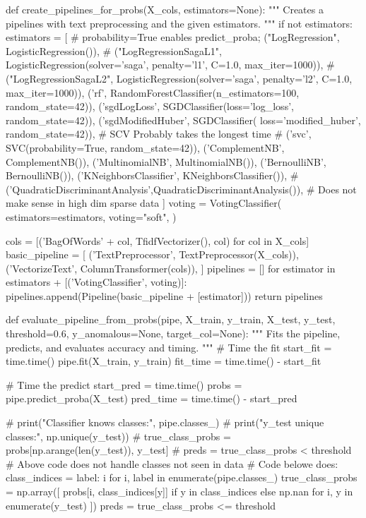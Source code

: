 {{def create_pipelines_for_probs(X_cols, estimators=None):
    """
    Creates a pipelines with text preprocessing and the given estimators.
    """
    if not estimators:
        estimators = [
            # probability=True enables predict_proba;
            ("LogRegression", LogisticRegression()),
            # ("LogRegressionSagaL1", LogisticRegression(solver='saga', penalty='l1', C=1.0, max_iter=1000)),
            # ("LogRegressionSagaL2", LogisticRegression(solver='saga', penalty='l2', C=1.0, max_iter=1000)),
            ('rf', RandomForestClassifier(n_estimators=100, random_state=42)),
            ('sgdLogLoss', SGDClassifier(loss='log_loss', random_state=42)),
            ('sgdModifiedHuber', SGDClassifier(
                loss='modified_huber', random_state=42)),
            # SCV Probably takes the longest time
            # ('svc', SVC(probability=True, random_state=42)),
            ('ComplementNB', ComplementNB()),
            ('MultinomialNB', MultinomialNB()),
            ('BernoulliNB', BernoulliNB()),
            ('KNeighborsClassifier', KNeighborsClassifier()),
            # ('QuadraticDiscriminantAnalysis',QuadraticDiscriminantAnalysis()), # Does not make sense in high dim sparse data
        ]
    voting = VotingClassifier(
        estimators=estimators,
        voting="soft",
    )

    cols = [('BagOfWords' + col, TfidfVectorizer(), col) for col in X_cols]
    basic_pipeline = [
        ('TextPreprocessor', TextPreprocessor(X_cols)),
        ('VectorizeText', ColumnTransformer(cols)),
    ]
    pipelines = []
    for estimator in estimators + [('VotingClassifier', voting)]:
        pipelines.append(Pipeline(basic_pipeline + [estimator]))
    return pipelines


def evaluate_pipeline_from_probs(pipe, X_train, y_train, X_test, y_test, threshold=0.6, y_anomalous=None, target_col=None):
    """
    Fits the pipeline, predicts, and evaluates accuracy and timing.
    """
    # Time the fit
    start_fit = time.time()
    pipe.fit(X_train, y_train)
    fit_time = time.time() - start_fit

    # Time the predict
    start_pred = time.time()
    probs = pipe.predict_proba(X_test)
    pred_time = time.time() - start_pred

    # print("Classifier knows classes:", pipe.classes_)
    # print("y_test unique classes:", np.unique(y_test))
    # true_class_probs = probs[np.arange(len(y_test)), y_test]
    # preds = true_class_probs < threshold
    # Above code does not handle classes not seen in data
    # Code belowe does:
    class_indices = {label: i for i, label in enumerate(pipe.classes_)}
    true_class_probs = np.array([
        probs[i, class_indices[y]] if y in class_indices else np.nan
        for i, y in enumerate(y_test)
    ])
    preds = true_class_probs <= threshold

}}
